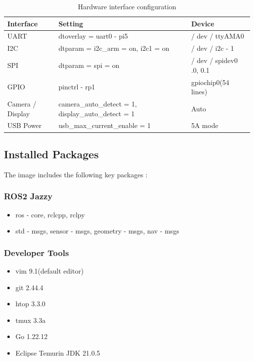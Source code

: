 \begin{table}[h]
\centering
\begin{tabular} {
      | l | l | l |
   }
    \hline
\textbf{Interface} & \textbf{Setting} & \textbf{Device}
    \\
\hline UART &dtoverlay = uart0 -
                          pi5 & / dev / ttyAMA0 \\
I2C &dtparam = i2c\_arm = on,
             i2c1 = on & / dev / i2c -
                    1 \\
SPI &dtparam = spi = on & / dev / spidev0 .0,
             0.1 \\
GPIO &pinctrl - rp1 &gpiochip0(54 lines) \\
Camera
                                       / Display &camera\_auto\_detect = 1,
             display\_auto\_detect =
                 1 &Auto \\
USB Power &usb\_max\_current\_enable = 1 & 5A mode \\
\hline
\end{tabular}
    \caption { Hardware interface configuration}
    \end{table}

    \subsection{Installed Packages}

    The image includes the following key packages :

\subsubsection{ROS2 Jazzy
   }
    \begin{itemize}
    \item ros - core, rclcpp, rclpy
    \item std - msgs, sensor - msgs, geometry - msgs, nav - msgs
\end{itemize}

    \subsubsection{Developer Tools}
    \begin{itemize}
    \item vim 9.1(default editor)
    \item git 2.44.4
    \item htop 3.3.0
    \item tmux 3.3a
    \item Go 1.22.12
    \item Eclipse Temurin JDK 21.0.5
\end{itemize}

